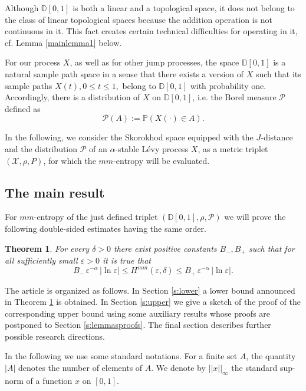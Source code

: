 \documentclass[12pt]{article}
\newcommand\D{\mathbb D}
\let\de\delta
\let\ep\varepsilon
\newcommand\PP{\mathcal P}
\newcommand{\prob}{\mathbb{P}}
\let\le\leqslant
\newtheorem{theorem}{Theorem}[section]
\theoremstyle{definition}
\begin{document}
Although $\D[0,1]$ is both a linear and a topological space, it does not belong to the class of linear topological spaces because the addition operation is not continuous in it. This fact creates certain technical difficulties for operating in it, cf. Lemma \ref{mainlemma1} below.
\bigskip

For our process $X$, as well as for other jump processes, the space $\D[0, 1]$ is a natural sample path space in a sense that there exists a version of $X$ such that its sample paths $X(t), 0\le t \le 1,$ belong to $\D[0,1]$ with probability one.
Accordingly, there is a distribution of $X$ on $\D[0, 1]$, i.e. the Borel measure $\PP$ defined as
\[
    \PP(A):= \prob(X(\cdot)\in A).
\]

In the following, we consider the Skorokhod space equipped with the $J$-distance and the distribution $\PP$ of an
$\alpha$-stable L\'evy process $X$,
as a metric triplet $(\mathcal{X}, \rho, P)$, for which the $mm$-entropy will be evaluated.

\subsection{The main result}

For $mm$-entropy of the just defined triplet $(\D[0,1],\rho,\PP)$  we will prove the following double-sided estimates having the same order.

\begin{theorem} \label{th1}
For every $\de > 0$ there exist positive  constants $B_-,B_+$ such that for all sufficiently small $\ep>0$ it is true that
\begin{equation} \label{th1_bounds}
          B_- \, \ep^{-\alpha} \,  |\ln\ep|  \leq H^{mm}(\ep, \de) \leq B_+ \, \ep^{-\alpha} \, |\ln\ep|.
\end{equation}
\end{theorem}

The article is organized as follows. In Section \ref{s:lower} a lower bound announced in Theorem \ref{th1} is obtained. In Section \ref{s:upper} we give a sketch of the proof of the corresponding upper bound using some auxiliary results whose proofs are postponed to 
Section \ref{s:lemmasproofs}. The final section describes further possible research directions.
\bigskip

In the following we use some standard notations. For a finite set $A$, the
quantity $|A|$ denotes the number of elements of $A$. We denote by $||x||_\infty$ the standard
sup-norm of a function $x$ on $[0,1]$.
\end{document}
